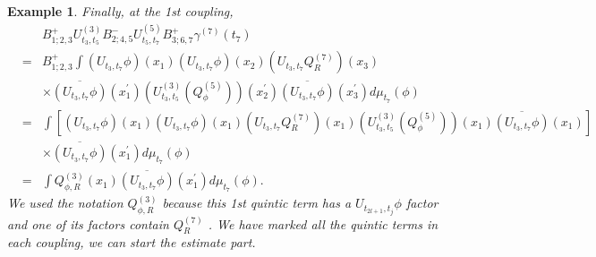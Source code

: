 \documentclass[12pt,letterpaper,leqno]{amsart}
\theoremstyle{plain}
\newtheorem{example}{Example}
\numberwithin{equation}{section}
\numberwithin{theorem}{section}
\numberwithin{proposition}{section}
\numberwithin{lemma}{section}
\numberwithin{corollary}{section}
\begin{document}
\begin{example}
Finally, at the 1st coupling,%
\begin{eqnarray*}
&&B_{1;2,3}^{+}U_{t_{3},t_{5}}^{(3)}B_{2;4,5}^{-}U_{t_{5},t_{7}}^{(5)}B_{3;6,7}^{+}\gamma ^{(7)}(t_{7})
\\
&=&B_{1;2,3}^{+}\int \left( U_{t_{3},t_{7}}\phi \right) (x_{1})\left(
U_{t_{3},t_{7}}\phi \right) (x_{2})\left( U_{t_{3},t_{7}}Q_{R}^{(7)}\right)
(x_{3}) \\
&&\times \overline{\left( U_{t_{3},t_{7}}\phi \right) }(x_{1}^{\prime
})\left( U_{t_{3},t_{5}}^{(3)}\left( Q_{\phi }^{(5)}\right) \right)
(x_{2}^{\prime })\overline{\left( U_{t_{3},t_{7}}\phi \right) }%
(x_{3}^{\prime })d\mu _{t_{7}}(\phi ) \\
&=&\int \left[ \left( U_{t_{3},t_{7}}\phi \right) (x_{1})\left(
U_{t_{3},t_{7}}\phi \right) (x_{1})\left( U_{t_{3},t_{7}}Q_{R}^{(7)}\right)
(x_{1})\left( U_{t_{3},t_{5}}^{(3)}\left( Q_{\phi }^{(5)}\right) \right)
(x_{1})\overline{\left( U_{t_{3},t_{7}}\phi \right) }(x_{1})\right] \\
&&\times \overline{\left( U_{t_{3},t_{7}}\phi \right) }(x_{1}^{\prime })d\mu
_{t_{7}}(\phi ) \\
&=&\int Q_{\phi ,R}^{(3)}(x_{1})\overline{\left( U_{t_{3},t_{7}}\phi \right) 
}(x_{1}^{\prime })d\mu _{t_{7}}(\phi ).
\end{eqnarray*}%
We used the notation $Q_{\phi ,R}^{(3)}$ because this 1st quintic term has a 
$U_{t_{2l+1},t_{j}}\phi $ factor and one of its factors contain $Q_{R}^{(7)}$%
. We have marked all the quintic terms in each coupling, we can start the
estimate part.


\end{example}
\end{document}
